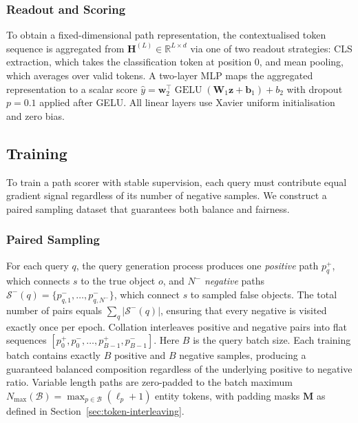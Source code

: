 \documentclass[runningheads]{llncs}
\begin{document}
\subsubsection{Readout and Scoring}

\label{sec:readout}

To obtain a fixed-dimensional path representation, the contextualised token
sequence is aggregated from
$\mathbf{H}^{(L)} \in \mathbb{R}^{L \times d}$
via one of two readout strategies: CLS extraction, which takes the
classification token at position 0, and mean pooling, which averages
over valid tokens.
A two-layer MLP maps the aggregated representation to a scalar score
$\hat{y} = \mathbf{w}_2^{\top} \operatorname{GELU}(\mathbf{W}_1 \mathbf{z} + \mathbf{b}_1) + b_2$
with dropout $p = 0.1$ applied after GELU.
All linear layers use Xavier
uniform initialisation and zero bias.

\subsection{Training}

\label{sec:training}

To train a path scorer with stable supervision, each query must contribute equal gradient
signal regardless of its number of negative samples.
We construct a paired sampling
dataset that guarantees both balance and fairness.
\subsubsection{Paired Sampling}
\label{sec:paired-sampling}

For each query $q$, the query generation process produces one
\textit{positive} path $p^+_q$, which connects $s$ to the
true object $o$, and $N^-$ \textit{negative} paths
$\mathcal{S}^-(q) = \{p^-_{q,1}, \ldots, p^-_{q,N^-}\}$, which connect
$s$ to sampled false objects. The total number of pairs equals
$\sum_q |\mathcal{S}^-(q)|$, ensuring that every negative is visited exactly
once per epoch. Collation interleaves positive and negative pairs
into flat sequences
$[p^+_0, p^-_0, \ldots, p^+_{B-1}, p^-_{B-1}]$.
Here $B$ is the query batch size. Each training batch contains
exactly $B$ positive and $B$ negative samples, producing a guaranteed
balanced composition regardless of the underlying positive to negative
ratio. Variable length paths are zero-padded to the batch maximum
$N_{\max}(\mathcal{B}) = \max_{p \in \mathcal{B}} (\ell_p + 1)$
entity tokens, with padding masks $\mathbf{M}$ as defined in
Section~\ref{sec:token-interleaving}.
\end{document}

